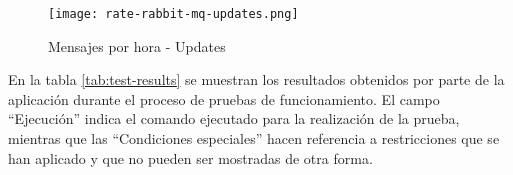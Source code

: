         \begin{figure}[H]
        \centering
            \texttt{[image: rate-rabbit-mq-updates.png]}
            \caption{Mensajes por hora - Updates}
            \label{fig:rabbitmq-rate-updates}
        \end{figure}
        
        En la tabla \ref{tab:test-results} se muestran los resultados obtenidos por parte de la aplicación durante el proceso de pruebas de funcionamiento. El campo ``Ejecución'' indica el comando ejecutado para la realización de la prueba, mientras que las ``Condiciones especiales'' hacen referencia a restricciones que se han aplicado y que no pueden ser mostradas de otra forma. 

        \begin{table}[H]             
            \centering                  
\end{table}
